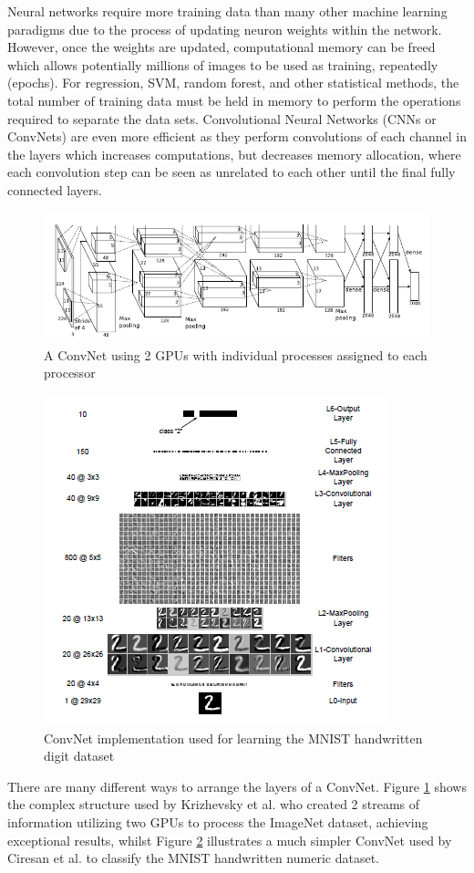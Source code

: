 \documentclass[fleqn,twoside,12pt]{report}
\begin{document}
Neural networks require more training data than many other machine learning paradigms due to the process of updating neuron weights within the network. However, once the weights are updated, computational memory can be freed which allows potentially millions of images to be used as training, repeatedly (epochs). For regression, SVM, random forest, and other statistical methods, the total number of training data must be held in memory to perform the operations required to separate the data sets. Convolutional Neural Networks (CNNs or ConvNets) are even more efficient as they perform convolutions of each channel in the layers which increases computations, but decreases memory allocation, where each convolution step can be seen as unrelated to each other until the final fully connected layers.


\begin{figure}[t]
	\centering
	\includegraphics[width=0.9\linewidth]{convnet1.png}
	\caption{A ConvNet using 2 GPUs with individual processes assigned to each processor}
	\label{fig:convnet1}
\end{figure}%


\begin{figure}[h]
	\centering
	\includegraphics[width=0.5\linewidth]{convnet2.png}
	\caption{ ConvNet implementation used for learning the MNIST handwritten digit dataset}
	\label{fig:convnet2}
\end{figure}%

There are many different ways to arrange the layers of a ConvNet. Figure \ref{fig:convnet1} shows the complex structure used by Krizhevsky et al.\cite{krizhevsky} who created 2 streams of information utilizing two GPUs to process the ImageNet dataset, achieving exceptional results, whilst Figure \ref{fig:convnet2} illustrates a much simpler ConvNet used by Ciresan et al.\cite{ciresan} to classify the MNIST handwritten numeric dataset. 
\end{document}
